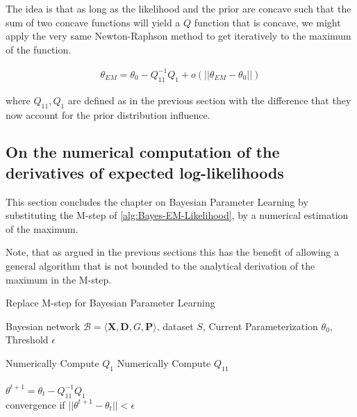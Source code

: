 \documentclass[11pt]{article}
\begin{document}
\begin{article}
The idea is that as long as the likelihood and the prior are
concave such that the sum of two concave functions will yield a \(Q\)
function that is concave, we might apply the very same
Newton-Raphson method to get iteratively to the maximum of the
function.

\begin{align} 
 \theta_{EM}  = \theta_{0} - Q_{11}^{-1} Q_1 + o(||\theta_{EM} - \theta_{0}||) \label{eq:em-iterative2}
\end{align}

where \(Q_{11}, Q_1\) are defined as in the previous section with the
difference that they now account for the prior distribution
influence.

\subsection{On the numerical computation of the derivatives of expected log-likelihoods}
\label{sec:orga7a27a8}

This section concludes the chapter on Bayesian Parameter Learning
by substituting the M-step of \ref{alg:Bayes-EM-Likelihood}, by a
numerical estimation of the maximum.

Note, that as argued in the previous sections this has the benefit
of allowing a general algorithm that is not bounded to the
analytical derivation of the maximum in the M-step.

\begin{algorithm*}[h!]
\caption{Replace M-step for Bayesian Parameter Learning}
\label{alg:Numerical-M-Step}
\vspace{-10pt}
\begin{multicols}{2}
\begin{algorithmic}[1] 
\Require Bayesian network $\mathcal{B}=\langle \mathbf{X},\mathbf{D}, G, \mathbf{P} \rangle$, dataset $S$, Current Parameterization $\theta_0$, Threshold $\epsilon$

   \State Numerically Compute $Q_1$
   \State Numerically Compute $Q_{11}$\\

   \\
      \State $\theta^{t+1}= \theta_{t} - Q_{11}^{-1} Q_1$\\
      \State convergence if $||\theta^{t+1} - \theta_{t}|| < \epsilon$
   \EndForAll
\end{algorithmic}
\end{multicols}
\end{algorithm*}


\end{article}
\end{document}
